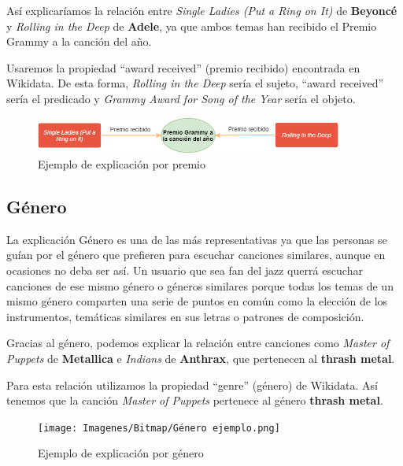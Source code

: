 Así explicaríamos la relación entre \textit{Single Ladies (Put a Ring on It)} de \textbf{Beyoncé} y \textit{Rolling in the Deep} de \textbf{Adele}, ya que ambos temas han recibido el Premio Grammy a la canción del año.

Usaremos la propiedad ``award received'' (premio recibido) encontrada en Wikidata. De esta forma, \textit{Rolling in the Deep} sería el sujeto, ``award received'' sería el predicado y \textit{Grammy Award for Song of the Year} sería el objeto.\\

\begin{figure}[h!]
	\centering
	\includegraphics[width = 0.9\textwidth]{Imagenes/Bitmap/Premio ejemplo.png}
	\caption{Ejemplo de explicación por premio}
	\label{fig:sampleImage}
\end{figure}

\subsection*{Género}

La explicación Género es una de las más representativas ya que las personas se guían por el género que prefieren para escuchar canciones similares, aunque en ocasiones no deba ser así. Un usuario que sea fan del jazz querrá escuchar canciones de ese mismo género o géneros similares porque todas los temas de un mismo género comparten una serie de puntos en común como la elección de los instrumentos, temáticas similares en sus letras o patrones de composición.

Gracias al género, podemos explicar la relación entre canciones como \textit{Master of Puppets} de \textbf{Metallica} e \textit{Indians} de \textbf{Anthrax}, que pertenecen al \textbf{thrash metal}.

Para esta relación utilizamos la propiedad ``genre'' (género) de Wikidata. Así tenemos que la canción \textit{Master of Puppets} pertenece al género \textbf{thrash metal}.\\

\begin{figure}[h!]
	\centering
	\texttt{[image: Imagenes/Bitmap/Género ejemplo.png]}
	\caption{Ejemplo de explicación por género}
	\label{fig:sampleImage}
\end{figure}

